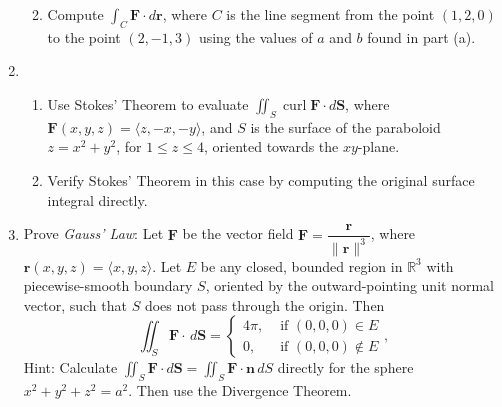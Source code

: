 \documentclass[12pt]{article}
\newcommand{\points}[1]{\marginpar{\hspace{24pt}[#1]}}
\newcommand{\R}{\mathbb{R}}
\renewcommand{\S}{\mathbf{S}}
\renewcommand{\r}{\mathbf{r}}
\newcommand{\dotp}{\,\boldsymbol{\cdot}\,}
\newcommand{\di}{\displaystyle}
\newcommand{\F}{\mathbf{F}}
\newcommand{\G}{\mathbf{G}}
\DeclareMathOperator{\curl}{curl}
\begin{document}
\begin{enumerate}
\begin{enumerate}
\vspace{4in}

\item Compute $\di \int_C \F\dotp d\r$, where $C$ is the line segment from the point $(1,2,0)$ to the point $(2,-1,3)$
using the values of $a$ and $b$ found in part (a). \points{4}
\end{enumerate}
\newpage

\item 
\begin{enumerate}
\item Use Stokes' Theorem to evaluate $\di \iint_S \curl\F\dotp d\S$, where $\F(x,y,z) = \langle z,-x,-y\rangle$, and $S$ is the surface of the paraboloid $z=x^2+y^2$, for $1\leq z\leq 4$, oriented towards the $xy$-plane. \points{8}

\vspace{3.5in}

\item Verify Stokes' Theorem in this case by computing the original surface integral directly. \points{8}


\end{enumerate}
\newpage

%
%
\item Prove {\em Gauss' Law}: Let $\F$ be the vector field $\F = \dfrac{\r}{\lVert\r\rVert^3}$, where $\r(x,y,z) = \langle x,y,z\rangle$. Let $E$ be any closed, bounded region in $\R^3$ with piecewise-smooth boundary $S$, oriented by the outward-pointing unit normal vector, such that $S$ does not pass through the origin. Then\points{12}
\[
\iint_S \F\dotp \,d\S = \begin{cases} 4\pi, & \text{ if } (0,0,0)\in E\\ 0, & \text{ if } (0,0,0)\notin E\end{cases},
\]
Hint: Calculate $\iint_S \F\dotp d\S = \iint_S \F\dotp \mathbf{n}\,dS$ directly for the sphere $x^2+y^2+z^2=a^2$. Then use the Divergence Theorem.
\end{enumerate}
\end{document}
